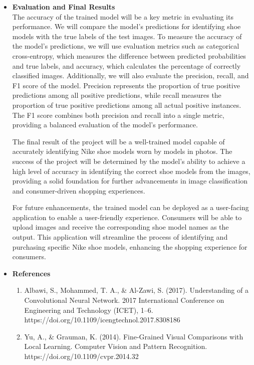 \documentclass{article}
\begin{document}
\begin{itemize}
\begin{enumerate}
		\end{enumerate}
            \item[] \textbf{Evaluation and Final Results} \\
		The accuracy of the trained model will be a key metric in evaluating its performance. We will compare the model's predictions for identifying shoe models with the true labels of the test images. To measure the accuracy of the model's predictions, we will use evaluation metrics such as categorical cross-entropy, which measures the difference between predicted probabilities and true labels, and accuracy, which calculates the percentage of correctly classified images. Additionally, we will also evaluate the precision, recall, and F1 score of the model. Precision represents the proportion of true positive predictions among all positive predictions, while recall measures the proportion of true positive predictions among all actual positive instances. The F1 score combines both precision and recall into a single metric, providing a balanced evaluation of the model's performance. 

  

The final result of the project will be a well-trained model capable of accurately identifying Nike shoe models worn by models in photos. The success of the project will be determined by the model's ability to achieve a high level of accuracy in identifying the correct shoe models from the images, providing a solid foundation for further advancements in image classification and consumer-driven shopping experiences. 

  

For future enhancements, the trained model can be deployed as a user-facing application to enable a user-friendly experience. Consumers will be able to upload images and receive the corresponding shoe model names as the output. This application will streamline the process of identifying and purchasing specific Nike shoe models, enhancing the shopping experience for consumers. 
‌             \item[] \textbf{References} 
		\begin{enumerate}
		\item Albawi, S., Mohammed, T. A., \& Al-Zawi, S. (2017). Understanding of a Convolutional Neural Network. 2017 International Conference on Engineering and Technology (ICET), 1–6. https://doi.org/10.1109/icengtechnol.2017.8308186  
		\item Yu, A., \& Grauman, K. (2014). Fine-Grained Visual Comparisons with Local Learning. Computer Vision and Pattern Recognition. https://doi.org/10.1109/cvpr.2014.32 
		\end{enumerate}
        \end{itemize}
\end{document}
